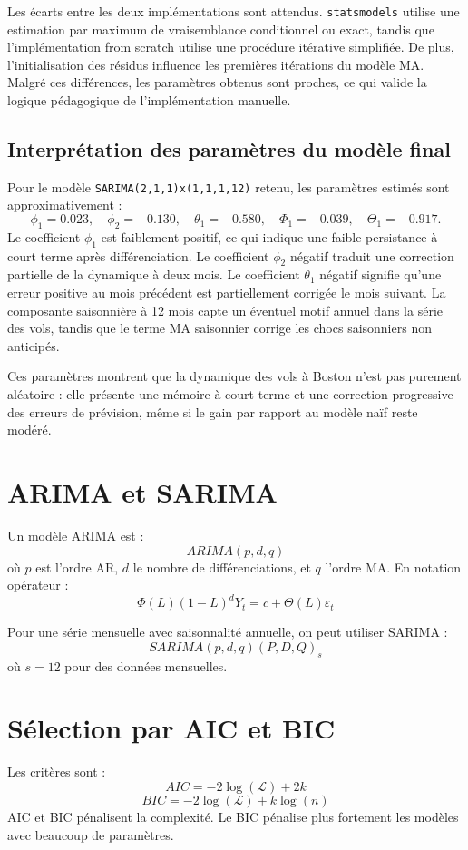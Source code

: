 \documentclass[12pt,a4paper]{report}
\begin{document}
Les écarts entre les deux implémentations sont attendus. \texttt{statsmodels} utilise une estimation par maximum de vraisemblance conditionnel ou exact, tandis que l'implémentation from scratch utilise une procédure itérative simplifiée. De plus, l'initialisation des résidus influence les premières itérations du modèle MA. Malgré ces différences, les paramètres obtenus sont proches, ce qui valide la logique pédagogique de l'implémentation manuelle.

\subsection{Interprétation des paramètres du modèle final}
Pour le modèle \texttt{SARIMA(2,1,1)x(1,1,1,12)} retenu, les paramètres estimés sont approximativement :
\[
\phi_1=0.023, \quad \phi_2=-0.130, \quad \theta_1=-0.580, \quad \Phi_1=-0.039, \quad \Theta_1=-0.917.
\]
Le coefficient $\phi_1$ est faiblement positif, ce qui indique une faible persistance à court terme après différenciation. Le coefficient $\phi_2$ négatif traduit une correction partielle de la dynamique à deux mois. Le coefficient $\theta_1$ négatif signifie qu'une erreur positive au mois précédent est partiellement corrigée le mois suivant. La composante saisonnière à 12 mois capte un éventuel motif annuel dans la série des vols, tandis que le terme MA saisonnier corrige les chocs saisonniers non anticipés.

Ces paramètres montrent que la dynamique des vols à Boston n'est pas purement aléatoire : elle présente une mémoire à court terme et une correction progressive des erreurs de prévision, même si le gain par rapport au modèle naïf reste modéré.

\section{ARIMA et SARIMA}
Un modèle ARIMA est :
\[
ARIMA(p,d,q)
\]
où $p$ est l'ordre AR, $d$ le nombre de différenciations, et $q$ l'ordre MA. En notation opérateur :
\[
\Phi(L)(1-L)^dY_t = c + \Theta(L)\varepsilon_t
\]

Pour une série mensuelle avec saisonnalité annuelle, on peut utiliser SARIMA :
\[
SARIMA(p,d,q)(P,D,Q)_s
\]
où $s=12$ pour des données mensuelles.

\section{Sélection par AIC et BIC}
Les critères sont :
\[
AIC = -2\log(\mathcal{L}) + 2k
\]
\[
BIC = -2\log(\mathcal{L}) + k\log(n)
\]
AIC et BIC pénalisent la complexité. Le BIC pénalise plus fortement les modèles avec beaucoup de paramètres.
\end{document}
